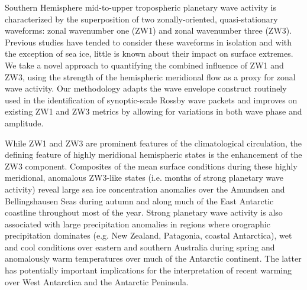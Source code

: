 Southern Hemisphere mid-to-upper tropospheric planetary wave activity is characterized by the superposition of two zonally-oriented, quasi-stationary waveforms: zonal wavenumber one (ZW1) and zonal wavenumber three (ZW3). Previous studies have tended to consider these waveforms in isolation and with the exception of sea ice, little is known about their impact on surface extremes. We take a novel approach to quantifying the combined influence of ZW1 and ZW3, using the strength of the hemispheric meridional flow as a proxy for zonal wave activity. Our methodology adapts the wave envelope construct routinely used in the identification of synoptic-scale Rossby wave packets and improves on existing ZW1 and ZW3 metrics by allowing for variations in both wave phase and amplitude.

While ZW1 and ZW3 are prominent features of the climatological circulation, the defining feature of highly meridional hemispheric states is the enhancement of the ZW3 component. Composites of the mean surface conditions during these highly meridional, anomalous ZW3-like states (i.e. months of strong planetary wave activity) reveal large sea ice concentration anomalies over the Amundsen and Bellingshausen Seas during autumn and along much of the East Antarctic coastline throughout most of the year. Strong planetary wave activity is also associated with large precipitation anomalies in regions where orographic precipitation dominates (e.g. New Zealand, Patagonia, coastal Antarctica), wet and cool conditions over eastern and southern Australia during spring and anomalously warm temperatures over much of the Antarctic continent. The latter has potentially important implications for the interpretation of recent warming over West Antarctica and the Antarctic Peninsula.
